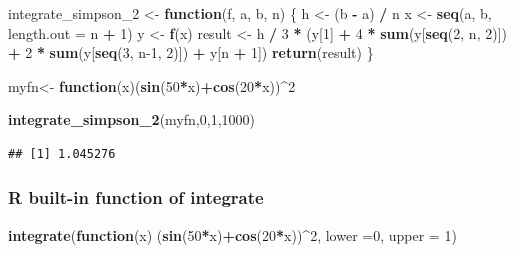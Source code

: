 \documentclass[
]{article}
\newenvironment{Shaded}{\begin{snugshade}}{\end{snugshade}}
\newcommand{\AttributeTok}[1]{\textcolor[rgb]{0.13,0.29,0.53}{#1}}
\newcommand{\ControlFlowTok}[1]{\textcolor[rgb]{0.13,0.29,0.53}{\textbf{#1}}}
\newcommand{\DecValTok}[1]{\textcolor[rgb]{0.00,0.00,0.81}{#1}}
\newcommand{\FunctionTok}[1]{\textcolor[rgb]{0.13,0.29,0.53}{\textbf{#1}}}
\newcommand{\NormalTok}[1]{#1}
\newcommand{\OtherTok}[1]{\textcolor[rgb]{0.56,0.35,0.01}{#1}}
\newcommand{\SpecialCharTok}[1]{\textcolor[rgb]{0.81,0.36,0.00}{\textbf{#1}}}
\begin{document}
\begin{Shaded}
\begin{Highlighting}[]
\NormalTok{integrate\_simpson\_2 }\OtherTok{\textless{}{-}} \ControlFlowTok{function}\NormalTok{(f, a, b, n) \{}
\NormalTok{  h }\OtherTok{\textless{}{-}}\NormalTok{ (b }\SpecialCharTok{{-}}\NormalTok{ a) }\SpecialCharTok{/}\NormalTok{ n}
\NormalTok{  x }\OtherTok{\textless{}{-}} \FunctionTok{seq}\NormalTok{(a, b, }\AttributeTok{length.out =}\NormalTok{ n }\SpecialCharTok{+} \DecValTok{1}\NormalTok{)}
\NormalTok{  y }\OtherTok{\textless{}{-}} \FunctionTok{f}\NormalTok{(x)}
\NormalTok{  result }\OtherTok{\textless{}{-}}\NormalTok{ h }\SpecialCharTok{/} \DecValTok{3} \SpecialCharTok{*}\NormalTok{ (y[}\DecValTok{1}\NormalTok{] }\SpecialCharTok{+} \DecValTok{4} \SpecialCharTok{*} \FunctionTok{sum}\NormalTok{(y[}\FunctionTok{seq}\NormalTok{(}\DecValTok{2}\NormalTok{, n, }\DecValTok{2}\NormalTok{)]) }\SpecialCharTok{+} \DecValTok{2} \SpecialCharTok{*} \FunctionTok{sum}\NormalTok{(y[}\FunctionTok{seq}\NormalTok{(}\DecValTok{3}\NormalTok{, n}\DecValTok{{-}1}\NormalTok{, }\DecValTok{2}\NormalTok{)]) }\SpecialCharTok{+}\NormalTok{ y[n }\SpecialCharTok{+} \DecValTok{1}\NormalTok{])}
  \FunctionTok{return}\NormalTok{(result)}
\NormalTok{\}}

\NormalTok{myfn}\OtherTok{\textless{}{-}} \ControlFlowTok{function}\NormalTok{(x)(}\FunctionTok{sin}\NormalTok{(}\DecValTok{50}\SpecialCharTok{*}\NormalTok{x)}\SpecialCharTok{+}\FunctionTok{cos}\NormalTok{(}\DecValTok{20}\SpecialCharTok{*}\NormalTok{x))}\SpecialCharTok{\^{}}\DecValTok{2}

\FunctionTok{integrate\_simpson\_2}\NormalTok{(myfn,}\DecValTok{0}\NormalTok{,}\DecValTok{1}\NormalTok{,}\DecValTok{1000}\NormalTok{)}
\end{Highlighting}
\end{Shaded}

\begin{verbatim}
## [1] 1.045276
\end{verbatim}

\hypertarget{r-built-in-function-of-integrate}{%
\subsubsection{R built-in function of
integrate}\label{r-built-in-function-of-integrate}}

\begin{Shaded}
\begin{Highlighting}[]
\FunctionTok{integrate}\NormalTok{(}\ControlFlowTok{function}\NormalTok{(x) (}\FunctionTok{sin}\NormalTok{(}\DecValTok{50}\SpecialCharTok{*}\NormalTok{x)}\SpecialCharTok{+}\FunctionTok{cos}\NormalTok{(}\DecValTok{20}\SpecialCharTok{*}\NormalTok{x))}\SpecialCharTok{\^{}}\DecValTok{2}\NormalTok{, }\AttributeTok{lower =}\DecValTok{0}\NormalTok{, }\AttributeTok{upper =} \DecValTok{1}\NormalTok{)}
\end{Highlighting}
\end{Shaded}
\end{document}
